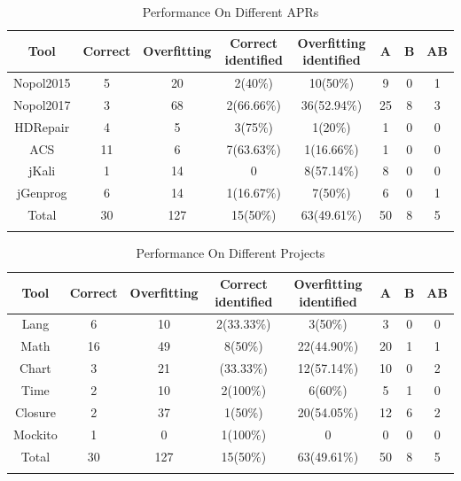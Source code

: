 \documentclass[sn-basic]{sn-jnl}
\theoremstyle{thmstyleone}
\theoremstyle{thmstyletwo}
\theoremstyle{thmstylethree}
\begin{document}
\begin{table}[ht]
	\begin{center}
		\begin{minipage}{\textwidth}
			\caption{Performance On Different APRs}\label{tab3}%
			\begin{tabular}{cccccccc}
				\toprule
				Tool & Correct & Overfitting &Correct identified &Overfitting identified &A
				&B &AB  \\
				\midrule
				Nopol2015    &5 &20 &2(40$\%$) &10(50$\%$) &9 &0 &1   \\
				Nopol2017    &3 &68 &2(66.66$\%$) &36(52.94$\%$) &25 &8 &3   \\
				HDRepair    &4 &5 &3(75$\%$) &1(20$\%$) &1 &0 &0     \\
				ACS    &11 &6 &7(63.63$\%$) &1(16.66$\%$) &1 &0 &0     \\
				jKali    &1 &14 &0 &8(57.14$\%$) &8 &0 &0     \\
				jGenprog    &6 &14 &1(16.67$\%$) &7(50$\%$) &6 &0 &1     \\
				Total    &30 &127 &15(50$\%$) &63(49.61$\%$) &50 &8 &5     \\
				\botrule
			\end{tabular}
		\end{minipage}
	\end{center}
\end{table}

\begin{table}[ht]
	\begin{center}
		\begin{minipage}{\textwidth}
			\caption{Performance On Different Projects}\label{tab4}%
			\begin{tabular}{cccccccc}
				\toprule
				Tool & Correct & Overfitting &Correct identified &Overfitting identified &A
				&B &AB  \\
				\midrule
				Lang    &6 &10 &2(33.33$\%$) &3(50$\%$) &3 &0 &0   \\
				Math    &16 &49 &8(50$\%$) &22(44.90$\%$) &20 &1 &1   \\
				Chart    &3 &21 &(33.33$\%$) &12(57.14$\%$) &10 &0 &2     \\
				Time    &2 &10 &2(100$\%$) &6(60$\%$) &5 &1 &0     \\
				Closure    &2 &37 &1(50$\%$) &20(54.05$\%$) &12 &6 &2     \\
				Mockito    &1 &0 &1(100$\%$) &0 &0 &0 &0     \\
				Total    &30 &127 &15(50$\%$) &63(49.61$\%$) &50 &8 &5     \\
				\botrule
			\end{tabular}
		\end{minipage}
	\end{center}
\end{table}
\end{document}
